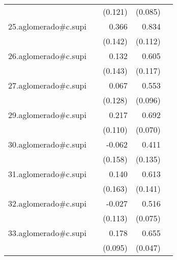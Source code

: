 {\begin{longtable}{l*{4}{D{.}{.}{-1}}}
            &                     &     (0.121)         &     (0.085)         &                     \\
\addlinespace
25.aglomerado#c.supi&                     &       0.366\sym{**} &       0.834\sym{***}&                     \\
            &                     &     (0.142)         &     (0.112)         &                     \\
\addlinespace
26.aglomerado#c.supi&                     &       0.132         &       0.605\sym{***}&                     \\
            &                     &     (0.143)         &     (0.117)         &                     \\
\addlinespace
27.aglomerado#c.supi&                     &       0.067         &       0.553\sym{***}&                     \\
            &                     &     (0.128)         &     (0.096)         &                     \\
\addlinespace
29.aglomerado#c.supi&                     &       0.217\sym{*}  &       0.692\sym{***}&                     \\
            &                     &     (0.110)         &     (0.070)         &                     \\
\addlinespace
30.aglomerado#c.supi&                     &      -0.062         &       0.411\sym{**} &                     \\
            &                     &     (0.158)         &     (0.135)         &                     \\
\addlinespace
31.aglomerado#c.supi&                     &       0.140         &       0.613\sym{***}&                     \\
            &                     &     (0.163)         &     (0.141)         &                     \\
\addlinespace
32.aglomerado#c.supi&                     &      -0.027         &       0.516\sym{***}&                     \\
            &                     &     (0.113)         &     (0.075)         &                     \\
\addlinespace
33.aglomerado#c.supi&                     &       0.178         &       0.655\sym{***}&                     \\
            &                     &     (0.095)         &     (0.047)         &                     \\

\end{longtable}}
